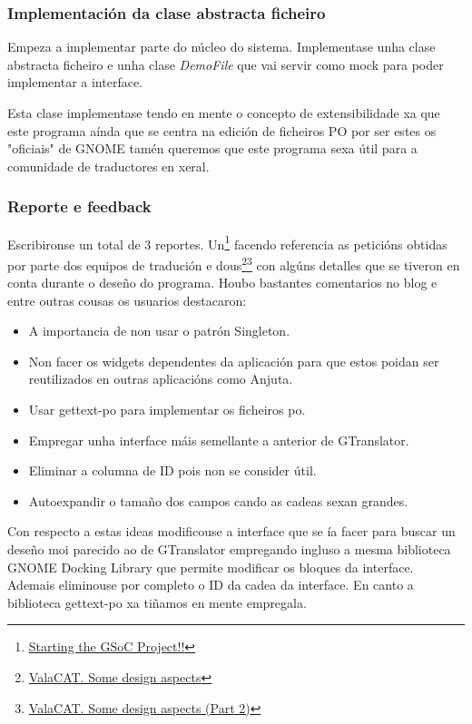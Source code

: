 \subsubsection{Implementación da clase abstracta ficheiro}
Empeza a implementar parte do núcleo do sistema. Implementase unha clase abstracta ficheiro e unha clase \emph{DemoFile} que vai servir como mock para poder implementar a interface.

Esta clase implementase tendo en mente o concepto de extensibilidade xa que este programa aínda que se centra na edición de ficheiros PO por ser estes os "oficiais" de GNOME tamén queremos que este programa sexa útil para a comunidade de traductores en xeral.

\subsubsection{Reporte e feedback}
Escribironse un total de 3 reportes. Un\footnote{\href{http://aquelando.info/startinggsocprojec/}{Starting the GSoC Project!!}} facendo referencia as peticións obtidas por parte dos equipos de tradución e dous\footnote{\href{http://aquelando.info/valacat-some-design-aspects/}{ValaCAT. Some design aspects}}\footnote{\href{http://aquelando.info/valacat-some-design-aspects-part-2/}{ValaCAT. Some design aspects (Part 2)}} con algúns detalles que se tiveron en conta durante o deseño do programa. Houbo bastantes comentarios no blog e entre outras cousas os usuarios destacaron:

\begin{itemize}
  \item A importancia de non usar o patrón Singleton.
  \item Non facer os widgets dependentes da aplicación para que estos poidan ser reutilizados en outras aplicacións como Anjuta.
  \item Usar gettext-po para implementar os ficheiros po.
  \item Empregar unha interface máis semellante a anterior de GTranslator.
  \item Eliminar a columna de ID pois non se consider útil.
  \item Autoexpandir o tamaño dos campos cando as cadeas sexan grandes.
\end{itemize}

Con respecto a estas ideas modificouse a interface que se ía facer para buscar un deseño moi parecido ao de GTranslator empregando ingluso a mesma biblioteca GNOME Docking Library que permite modificar os bloques da interface. Ademais eliminouse por completo o ID da cadea da interface. En canto a biblioteca gettext-po xa tiñamos en mente empregala.

